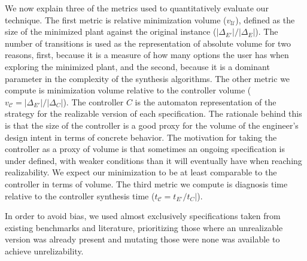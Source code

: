 We now explain three of the metrics used to quantitatively evaluate our technique. The first metric is relative minimization volume ($v_{\mathcal{U}}$), defined as the size of the minimized plant against the original instance ($|\Delta_{E'}|/|\Delta_{E}|$). 
The number of transitions is used as the representation of absolute volume for two reasons, first, because it is a measure of how many options the user has when exploring the minimized plant, and the  second, because it is a dominant parameter in the complexity of the synthesis algorithms. 
The other metric we compute is minimization volume relative to the controller volume ($v_{\mathcal{C}}=|\Delta_{E'}|/|\Delta_{C}|$). The controller $C$ is the automaton representation of the strategy for the realizable version of each specification. The rationale behind this is that the size of the controller is a good proxy for the volume of the engineer's design intent in terms of concrete behavior. The motivation for taking the controller as a proxy of volume is that sometimes an ongoing specification is under defined, with weaker conditions than it will eventually have when reaching realizability. We expect our minimization to be at least comparable to the controller in terms of volume. The third metric we compute is diagnosis time relative to the controller synthesis time ($t_{\mathcal{C}}=t_{E'}/t_{C}|$).

In order to avoid bias, we used almost exclusively specifications taken from existing benchmarks and literature, prioritizing those where an unrealizable version was already present and mutating those were none was available to achieve unrelizability. 

